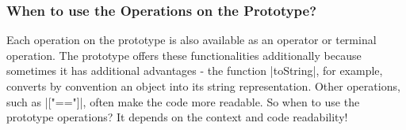 \subsubsection{When to use the Operations on the Prototype?} %
\label{subsub:When to use the operations on the prototype?}
Each operation on the prototype is also available as an operator or terminal
operation. The prototype offers these functionalities additionally because
sometimes it has additional advantages - the function |toString|, for example,
converts by convention an object into its string representation. Other
operations, such as |["=="]|, often make the code more readable. So when to use
the prototype operations? It depends on the context and code readability!


